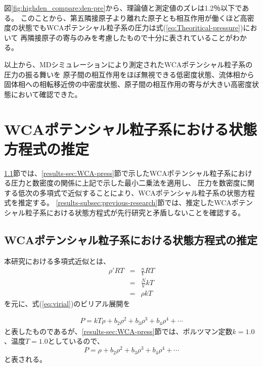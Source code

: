 \documentclass[titlepage]{jsreport}
\begin{document}
{{{図\ref{fig:highden_compare:den-pre}から、理論値と測定値のズレは1.2％以下である。
このことから、第五隣接原子より離れた原子とも相互作用が働くほど高密度の状態でもWCAポテンシャル粒子系の圧力は式(\ref{eq:Theoritical-pressure})において
再隣接原子の寄与のみを考慮したもので十分に表されていることがわかる。

以上から、MDシミュレーションにより測定されたWCAポテンシャル粒子系の圧力の振る舞いを
原子間の相互作用をほぼ無視できる低密度状態、流体相から固体相への相転移近傍の中密度状態、原子間の相互作用の寄与が大きい高密度状態において確認できた。



\newpage
\section{WCAポテンシャル粒子系における状態方程式の推定}\label{results-sec:WCA-equation}

\ref{results-subsec:WCA-equation}節では、\ref{results-sec:WCA-press}節で示したWCAポテンシャル粒子系における圧力と数密度の関係に上記で示した最小二乗法を適用し、
圧力を数密度に関する低次の多項式で近似することにより、WCAポテンシャル粒子系の状態方程式を推定する。
\ref{results-subsec:previous-research}節では、推定したWCAポテンシャル粒子系における状態方程式が先行研究と矛盾しないことを確認する。


\subsection{WCAポテンシャル粒子系における状態方程式の推定}\label{results-subsec:WCA-equation}
本研究における多項式近似とは、
\large
\begin{eqnarray}
    {{\rho}'}RT \nonumber &=& \frac{n}{V}RT \nonumber \\ 
    &=& \frac{N}{V}kT \nonumber \\ 
    &=& {\rho}kT \nonumber
\end{eqnarray}
\normalsize
を元に、式(\ref{eq:virial})のビリアル展開を

\large
\begin{eqnarray}
    P=kT\rho+b_2\rho^2+b_3\rho^3+b_4\rho^4+\cdots\label{eq:search-virial} \nonumber
\end{eqnarray}
\normalsize
と表したものであるが、\ref{results-sec:WCA-press}節では、ボルツマン定数$k=1.0$、温度$T=1.0$としているので、
\large
\begin{equation}
    P=\rho+b_2\rho^2+b_3\rho^3+b_4\rho^4+\cdots\label{eq:modified-search-virial}
\end{equation}
\normalsize
と表される。

}}}
\end{document}
